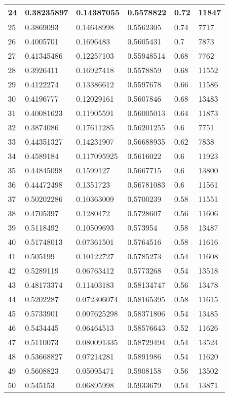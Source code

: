 \begin{longtable}{|l|l|l|l|l|l|}
24 & 0.38235897 & 0.14387055 & 0.5578822 & 0.72 & 11847 \\ \hline 
25 & 0.3869093 & 0.14648998 & 0.5562305 & 0.74 & 7717 \\ \hline 
26 & 0.4005701 & 0.1696483 & 0.5605431 & 0.7 & 7873 \\ \hline 
27 & 0.41345486 & 0.12257103 & 0.55948514 & 0.68 & 7762 \\ \hline 
28 & 0.3926411 & 0.16927418 & 0.5578859 & 0.68 & 11552 \\ \hline 
29 & 0.4122274 & 0.13386612 & 0.5597678 & 0.66 & 11586 \\ \hline 
30 & 0.4196777 & 0.12029161 & 0.5607846 & 0.68 & 13483 \\ \hline 
31 & 0.40081623 & 0.11905591 & 0.56005013 & 0.64 & 11873 \\ \hline 
32 & 0.3874086 & 0.17611285 & 0.56201255 & 0.6 & 7751 \\ \hline 
33 & 0.44351327 & 0.14231907 & 0.56688935 & 0.62 & 7838 \\ \hline 
34 & 0.4589184 & 0.117095925 & 0.5616022 & 0.6 & 11923 \\ \hline 
35 & 0.44845098 & 0.1599127 & 0.5667715 & 0.6 & 13800 \\ \hline 
36 & 0.44472498 & 0.1351723 & 0.56781083 & 0.6 & 11561 \\ \hline 
37 & 0.50202286 & 0.10363009 & 0.5700239 & 0.58 & 11551 \\ \hline 
38 & 0.4705397 & 0.1280472 & 0.5728607 & 0.56 & 11606 \\ \hline 
39 & 0.5118492 & 0.10509693 & 0.573954 & 0.58 & 13487 \\ \hline 
40 & 0.51748013 & 0.07361501 & 0.5764516 & 0.58 & 11616 \\ \hline 
41 & 0.505199 & 0.10122727 & 0.5785273 & 0.54 & 11608 \\ \hline 
42 & 0.5289119 & 0.06763412 & 0.5773268 & 0.54 & 13518 \\ \hline 
43 & 0.48173374 & 0.11403183 & 0.58134747 & 0.56 & 13478 \\ \hline 
44 & 0.5202287 & 0.072306074 & 0.58165395 & 0.58 & 11615 \\ \hline 
45 & 0.5733901 & 0.007625298 & 0.58371806 & 0.54 & 13485 \\ \hline 
46 & 0.5434445 & 0.06464513 & 0.58576643 & 0.52 & 11626 \\ \hline 
47 & 0.5110073 & 0.080091335 & 0.58729494 & 0.54 & 13524 \\ \hline 
48 & 0.53668827 & 0.07214281 & 0.5891986 & 0.54 & 11620 \\ \hline 
49 & 0.5608823 & 0.05095471 & 0.5908158 & 0.56 & 13502 \\ \hline 
50 & 0.545153 & 0.06895998 & 0.5933679 & 0.54 & 13871 \\ \hline 
\end{longtable}